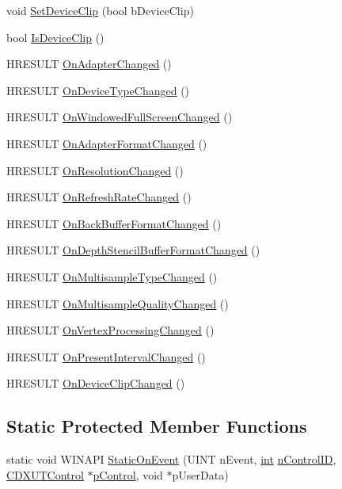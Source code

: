 \begin{DoxyCompactItemize}
\item 
void \hyperlink{class_c_d3_d_settings_dlg_ab5e85523266807441c34a4439163550f}{SetDeviceClip} (bool bDeviceClip)
\item 
bool \hyperlink{class_c_d3_d_settings_dlg_ac5d2815eced3dcc37c0313ffd1e522ca}{IsDeviceClip} ()
\item 
HRESULT \hyperlink{class_c_d3_d_settings_dlg_a16315666d38d33b8d6b6b896f854eb42}{OnAdapterChanged} ()
\item 
HRESULT \hyperlink{class_c_d3_d_settings_dlg_a6e9145611a264f08597503e32a51aeea}{OnDeviceTypeChanged} ()
\item 
HRESULT \hyperlink{class_c_d3_d_settings_dlg_ae6c060173543d659cf6e4d810971c3ee}{OnWindowedFullScreenChanged} ()
\item 
HRESULT \hyperlink{class_c_d3_d_settings_dlg_a422dec4deed87610ff75783dceb2b4b8}{OnAdapterFormatChanged} ()
\item 
HRESULT \hyperlink{class_c_d3_d_settings_dlg_a37daa5c226dfa883b9bd9675f587188d}{OnResolutionChanged} ()
\item 
HRESULT \hyperlink{class_c_d3_d_settings_dlg_a5f321948ac07b6c0707dfa65f9cbd990}{OnRefreshRateChanged} ()
\item 
HRESULT \hyperlink{class_c_d3_d_settings_dlg_a2ec3c8e1d0fb192aa5448c4ac8f138b2}{OnBackBufferFormatChanged} ()
\item 
HRESULT \hyperlink{class_c_d3_d_settings_dlg_a7d589e810b5680c966665c94190b0170}{OnDepthStencilBufferFormatChanged} ()
\item 
HRESULT \hyperlink{class_c_d3_d_settings_dlg_a5979860f92903f58815328188bb2255f}{OnMultisampleTypeChanged} ()
\item 
HRESULT \hyperlink{class_c_d3_d_settings_dlg_ad4f5ee2ea8bc3d590fb7748987af28e6}{OnMultisampleQualityChanged} ()
\item 
HRESULT \hyperlink{class_c_d3_d_settings_dlg_a3462ae5f6053ed30ce6ce269ca155c82}{OnVertexProcessingChanged} ()
\item 
HRESULT \hyperlink{class_c_d3_d_settings_dlg_a4ebbdfd84ac6ddf9cfaa0aba72b49681}{OnPresentIntervalChanged} ()
\item 
HRESULT \hyperlink{class_c_d3_d_settings_dlg_a56d8e003ce194520995c88c531349f01}{OnDeviceClipChanged} ()
\end{DoxyCompactItemize}
\subsection*{Static Protected Member Functions}
\begin{DoxyCompactItemize}
\item 
static void WINAPI \hyperlink{class_c_d3_d_settings_dlg_a55cc59820bc86efb9819739110f9190f}{StaticOnEvent} (UINT nEvent, \hyperlink{_d_x_u_tgui_8cpp_a2d77ed03302b6978834ee3b6f57837fb}{int} \hyperlink{_d_x_u_tgui_8h_a73dfd1d736300572e8c3d1a961a52ebf}{nControlID}, \hyperlink{class_c_d_x_u_t_control}{CDXUTControl} $\ast$\hyperlink{_d_x_u_tgui_8h_a02afd33ae98ec4c57be6013765c03be9}{pControl}, void $\ast$pUserData)
\end{DoxyCompactItemize}
